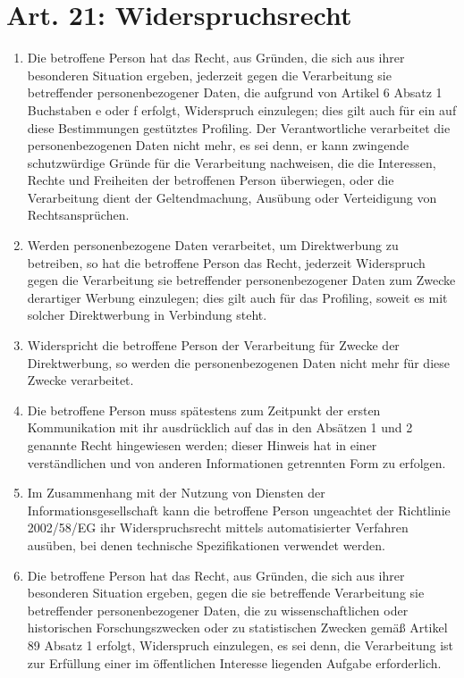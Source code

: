 \documentclass[A4, 12pt]{scrbook}
\begin{document}
    \section{Art. 21: Widerspruchsrecht}
        \begin{enumerate}[label=(\arabic*]
            \item Die betroffene Person hat das Recht, aus Gründen, die sich aus ihrer besonderen Situation ergeben, jederzeit gegen die Verarbeitung sie betreffender personenbezogener Daten, die aufgrund von Artikel 6 Absatz 1 Buchstaben e oder f erfolgt, Widerspruch einzulegen; dies gilt auch für ein auf diese Bestimmungen gestütztes Profiling. Der Verantwortliche verarbeitet die personenbezogenen Daten nicht mehr, es sei denn, er kann zwingende schutzwürdige Gründe für die Verarbeitung nachweisen, die die Interessen, Rechte und Freiheiten der betroffenen Person überwiegen, oder die Verarbeitung dient der Geltendmachung, Ausübung oder Verteidigung von Rechtsansprüchen.
            \item Werden personenbezogene Daten verarbeitet, um Direktwerbung zu betreiben, so hat die betroffene Person das Recht, jederzeit Widerspruch gegen die Verarbeitung sie betreffender personenbezogener Daten zum Zwecke derartiger Werbung einzulegen; dies gilt auch für das Profiling, soweit es mit solcher Direktwerbung in Verbindung steht. 
            \item Widerspricht die betroffene Person der Verarbeitung für Zwecke der Direktwerbung, so werden die personenbezogenen Daten nicht mehr für diese Zwecke verarbeitet.
            \item Die betroffene Person muss spätestens zum Zeitpunkt der ersten Kommunikation mit ihr ausdrücklich auf das in den Absätzen 1 und 2 genannte Recht hingewiesen werden; dieser Hinweis hat in einer verständlichen und von anderen Informationen getrennten Form zu erfolgen.
            \item Im Zusammenhang mit der Nutzung von Diensten der Informationsgesellschaft kann die betroffene Person ungeachtet der Richtlinie 2002/58/EG ihr Widerspruchsrecht mittels automatisierter Verfahren ausüben, bei denen technische Spezifikationen verwendet werden. 
            \item Die betroffene Person hat das Recht, aus Gründen, die sich aus ihrer besonderen Situation ergeben, gegen die sie betreffende Verarbeitung sie betreffender personenbezogener Daten, die zu wissenschaftlichen oder historischen Forschungszwecken oder zu statistischen Zwecken gemäß Artikel 89 Absatz 1 erfolgt, Widerspruch einzulegen, es sei denn, die Verarbeitung ist zur Erfüllung einer im öffentlichen Interesse liegenden Aufgabe erforderlich. 
        \end{enumerate}
\end{document}
